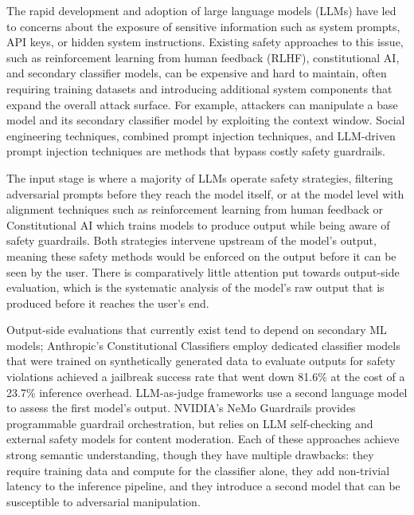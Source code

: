 \documentclass[11pt]{article}
\begin{document}
The rapid development and adoption of large language models (LLMs) have led to concerns about
the exposure of sensitive information such as system prompts, API keys, or hidden system instructions. Existing safety approaches to this issue, such as reinforcement learning from human feedback
(RLHF), constitutional AI, and secondary classifier models, can be expensive and hard to maintain, often requiring training datasets and introducing additional system components that expand
the overall attack surface. For example, attackers can manipulate a base model and its secondary
classifier model by exploiting the context window. Social engineering techniques, combined prompt
injection techniques, and LLM-driven prompt injection techniques are methods that bypass costly
safety guardrails.

The input stage is where a majority of LLMs operate safety strategies, filtering adversarial
prompts before they reach the model itself, or at the model level with alignment techniques such as
reinforcement learning from human feedback \citep{christiano2017deep} or Constitutional AI \citep{bai2022constitutional} which trains models to
produce output while being aware of safety guardrails. Both strategies intervene upstream of the
model's output, meaning these safety methods would be enforced on the output before it can be
seen by the user. There is comparatively little attention put towards output-side evaluation, which
is the systematic analysis of the model's raw output that is produced before it reaches the user's
end.

Output-side evaluations that currently exist tend to depend on secondary ML models; Anthropic's Constitutional Classifiers \citep{sharma2025constitutional} employ dedicated classifier models that were trained on
synthetically generated data to evaluate outputs for safety violations achieved a jailbreak success
rate that went down 81.6\% at the cost of a 23.7\% inference overhead. LLM-as-judge frameworks
\citep{zheng2023judging} use a second language model to assess the first model's output. NVIDIA's NeMo Guardrails \citep{rebedea2023nemo}
provides programmable guardrail orchestration, but relies on LLM self-checking and external safety
models for content moderation. Each of these approaches achieve strong semantic understanding,
though they have multiple drawbacks: they require training data and compute for the classifier
alone, they add non-trivial latency to the inference pipeline, and they introduce a second model
that can be susceptible to adversarial manipulation.
\end{document}

